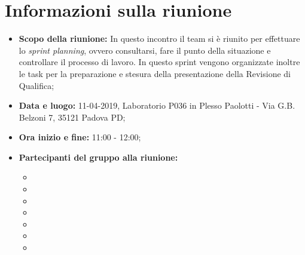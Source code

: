 \clearpage
\section{Informazioni sulla riunione}
\begin{itemize}
	\item \textbf {Scopo della riunione:} In questo incontro il team si è riunito per effettuare lo \textit{sprint planning}, ovvero consultarsi, fare il punto della situazione e controllare il processo di lavoro. In questo sprint vengono organizzate inoltre le task per la preparazione e stesura della presentazione della Revisione di Qualifica;
	\item \textbf {Data e luogo:} 11-04-2019, Laboratorio P036 in Plesso Paolotti - Via G.B. Belzoni 7, 35121 Padova PD;
	\item \textbf {Ora inizio e fine:} 11:00 - 12:00;
	\item \textbf {Partecipanti del gruppo alla riunione:} 
		 \begin{itemize}
			\item \sonia
			\item \pardeep
			\item \luca
			\item \matteo
			\item \alberto
			\item \alessandro
			\item \andrea
		\end{itemize}
\end{itemize}